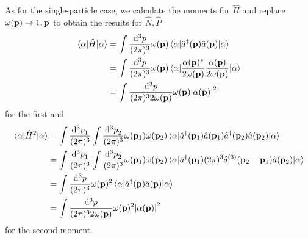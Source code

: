 As for the single-particle case, we calculate the moments for $\hat{H}$ and replace $\omega(\vb{p})\to1,\vb{p}$ to obtain the results for $\hat{N},\hat{P}$
\begin{equation}
	\begin{split}
		\expval{\hat{H}}{\alpha}
		&=
		\int\frac{\dd[3]{p}}{(2\pi)^3}
		\omega(\vb{p})
		\expval{\hat{a}^\dagger(\vb{p})\hat{a}(\vb{p})}{\alpha}
		\\
		&=
		\int\frac{\dd[3]{p}}{(2\pi)^3}
		\omega(\vb{p})
		\expval{\frac{\alpha(\vb{p})^*}{2\omega(\vb{p})}\frac{\alpha(\vb{p})}{2\omega(\vb{p})}}{\alpha}
		\\
		&=
		\int\frac{\dd[3]{p}}{(2\pi)^32\omega(\vb{p})}
		\omega(\vb{p})
		\abs{\alpha(\vb{p})}^2
	\end{split}
\end{equation}
for the first and
\begin{equation}
	\begin{split}
		\expval{\hat{H}^2}{\alpha}
		&=
		\int\frac{\dd[3]{p}_1}{(2\pi)^3}
		\int\frac{\dd[3]{p}_2}{(2\pi)^3}
		\omega(\vb{p}_1)
		\omega(\vb{p}_2)
		\expval{
			\hat{a}^\dagger(\vb{p}_1)
			\hat{a}(\vb{p}_1)
			\hat{a}^\dagger(\vb{p}_2)
			\hat{a}(\vb{p}_2)
		}{\alpha}
		\\
		&=
		\int\frac{\dd[3]{p}_1}{(2\pi)^3}
		\int\frac{\dd[3]{p}_2}{(2\pi)^3}
		\omega(\vb{p}_1)
		\omega(\vb{p}_2)
		\expval{
			\hat{a}^\dagger(\vb{p}_1)
			(2\pi)^3
			\delta^{(3)}(\vb{p}_2-\vb{p}_1)
			\hat{a}(\vb{p}_2)
		}{\alpha}
		\\
		&=
		\int\frac{\dd[3]{p}}{(2\pi)^3}
		\omega(\vb{p})^2
		\expval{
			\hat{a}^\dagger(\vb{p})
			\hat{a}(\vb{p})
		}{\alpha}
		\\
		&=
		\int\frac{\dd[3]{p}}{(2\pi)^32\omega(\vb{p})}
		\omega(\vb{p})^2
		\abs{\alpha(\vb{p})}^2
	\end{split}
\end{equation}
for the second moment.

